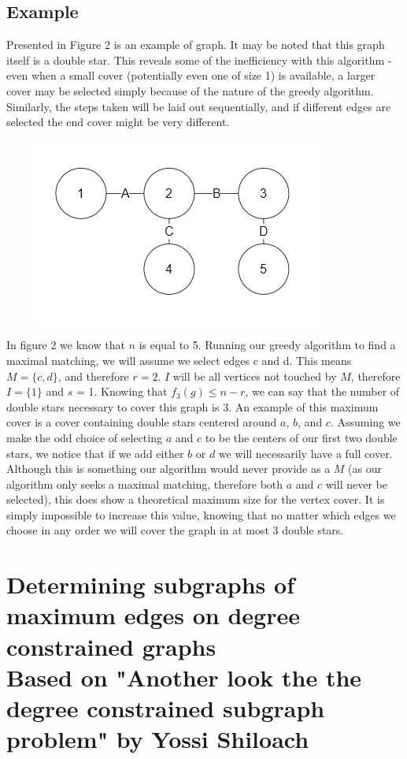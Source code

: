 \documentclass{article}
\begin{document}
		\subsection{Example}
		Presented in Figure 2 is an example of graph. It may be noted that this graph itself is a double star. This reveals some of the inefficiency with this algorithm - even when a small cover (potentially even one of size 1) is available, a larger cover may be selected simply because of the nature of the greedy algorithm. Similarly, the steps taken will be laid out sequentially, and if different edges are selected the end cover might be very different.
		 \\
				\begin{figure}[H]
				\caption{}
				\includegraphics{Figure2}
			\end{figure}
			In figure 2 we know that $n$ is equal to 5. Running our greedy algorithm to find a maximal matching, we will assume we select edges c and d. This means $M = \{c,d\}$, and therefore $r = 2$. $I$ will be all vertices not touched by $M$, therefore $I = \{1\}$ and $s$ = 1. Knowing that $f_{3}(g) \leq n-r$, we can say that the  number of double stars necessary to cover this graph is 3. An example of this maximum cover is a cover containing double stars centered around $a$, $b$, and $c$. Assuming we make the odd choice of selecting $a$ and $c$ to be the centers of our first two double stars, we notice that if we add either $b$ or $d$ we will necessarily have a full cover. Although this is something our algorithm would never provide as a $M$ (as our algorithm only seeks a maximal matching, therefore both $a$ and $c$ will never be selected), this does show a theoretical maximum size for the vertex cover. It is simply impossible to increase this value, knowing that no matter which edges we choose in any order we will cover the graph in at most 3 double stars.
			
	\section{Determining subgraphs of maximum edges on degree constrained graphs \\ {\small Based on "Another look the the degree constrained subgraph problem" by Yossi Shiloach \cite{2}}  }
\end{document}
